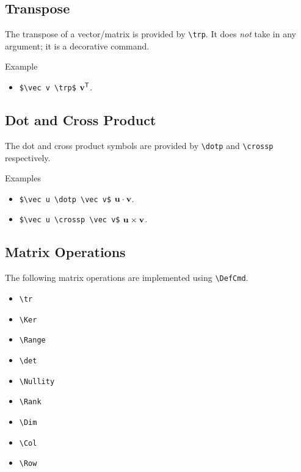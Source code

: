 
\subsection{Transpose}

The transpose of a vector/matrix is provided by \verb|\trp|. It does \emph{not} take in any argument; it is a decorative command.

\begin{myframe}{Example}
    \begin{itemize}
        \item \verb|$\vec v \trp$| \produces{} $\mathbf{v} ^{\mathsf{T}}$.
    \end{itemize}
\end{myframe}

\subsection{Dot and Cross Product}

The dot and cross product symbols are provided by \verb|\dotp| and \verb|\crossp| respectively.

\begin{myframe}{Examples}
    \begin{itemize}
        \item \verb|$\vec u \dotp \vec v$| \produces{} $\mathbf{u} \cdot \mathbf{v}$.
        \item \verb|$\vec u \crossp \vec v$| \produces{} $\mathbf{u} \times \mathbf{v}$.
    \end{itemize}
\end{myframe}

\subsection{Matrix Operations}

The following matrix operations are implemented using \verb|\DefCmd|.

\begin{multicols}{3}
    \begin{itemize}
        \item \verb|\tr|
        \item \verb|\Ker|
        \item \verb|\Range|
        \item \verb|\det|
        \item \verb|\Nullity|
        \item \verb|\Rank|
        \item \verb|\Dim|
        \item \verb|\Col|
        \item \verb|\Row|
    \end{itemize}
\end{multicols}

